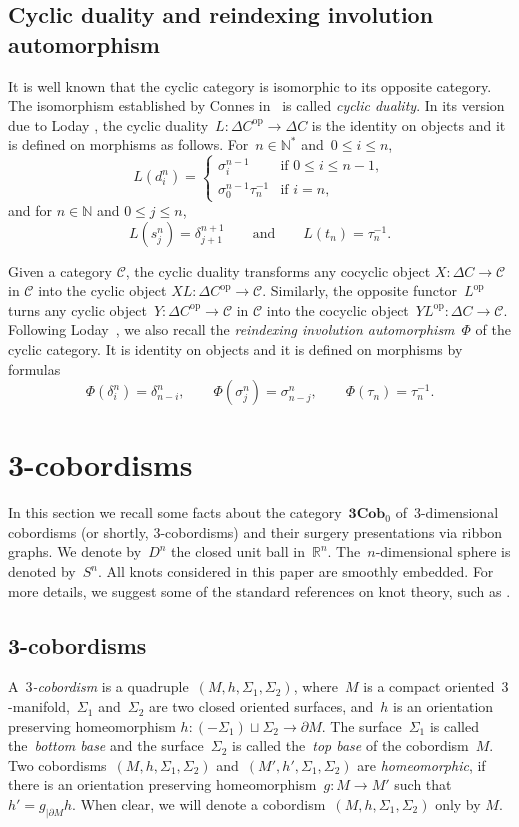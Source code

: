 \documentclass[10pt,a4paper]{amsart}
\numberwithin{equation}{section}
\newcommand{\co}{\colon}
\newcommand{\mc}{\mathcal}
\newcommand{\opp}{\mathrm{op}}
\newcommand{\N}{\mathbb{N}}
\newcommand{\R}{\mathbb{R}}
\newcommand{\Cob}{\textbf{Cob}}
\begin{document}
\subsection{Cyclic duality and reindexing involution automorphism} \label{connes loday dual}
It is well known that the cyclic category is isomorphic to its opposite category. The isomorphism established by Connes in~\cite{Connesext} is called \textit{cyclic duality}.
In its version due to Loday \cite[Proposition~6.1.11]{loday98}, the cyclic duality~$L \co \Delta C^\opp \to \Delta C$ is the identity on objects and it is defined on morphisms as follows.
For~$n\in \N^*$ and~$0\leq i \leq n$,
\[L(d_i^n)=
\begin{cases}
\sigma_i^{n-1} & \text{if } 0\leq i \leq n-1, \\
\sigma_0^{n-1}\tau_{n}^{-1} & \text{if } i=n,
\end{cases}\]
and for $n\in \N$ and $0\leq j \leq n$,
\[L(s_j^n)=\delta_{j+1}^{n+1} \qquad \text{and} \qquad L(t_n)=\tau_n^{-1}.\]

Given a category $\mc C$, the cyclic duality transforms any cocyclic object $X \co \Delta C \to {\mc C}$ in $\mc C$ into the cyclic object $XL\co \Delta C^\opp \to \mc C$. Similarly, the opposite functor~$L^\opp$ turns any cyclic object~$Y \co \Delta C^\opp \to \mc C$ in $\mc C$ into the cocyclic object~$YL^\opp \co \Delta C \to {\mc C}$.
Following Loday~\cite[Sec\-tion~6.1.14]{loday98}, we also recall the \textit{reindexing involution automorphism}~$\Phi$ of the cyclic category. It is identity on objects and it is defined on morphisms by formulas
\[\Phi(\delta_i^n)=\delta_{n-i}^n, \qquad \Phi(\sigma_j^n)=\sigma_{n-j}^n, \qquad \Phi(\tau_n)= \tau_n^{-1}.
\]

\section{3-cobordisms} \label{seccobs}
In this section we recall some facts about the category~$\textbf{3}\Cob_0$ of~$3$-dimensional cobordisms (or shortly, $3$-cobordisms) and their surgery presentations via ribbon graphs.
We denote by~$D^n$ the closed unit ball in~$\R^n$. The~$n$-dimensional sphere is denoted by~$S^n$.
All knots considered in this paper are smoothly embedded. For more details, we suggest some of the standard references on knot theory, such as \cite{burde2002knots, lickorish97}.

\subsection{3-cobordisms}
A~\emph{$3$-cobordism} is a quadruple~$(M,h,\Sigma_1,\Sigma_2)$, where~$M$ is a compact oriented~$3$-manifold,~$\Sigma_1$ and~$\Sigma_2$ are two closed oriented surfaces, and~$h$ is an orientation preserving homeomorphism $h\co (-\Sigma_1) \sqcup \Sigma_2 \to \partial M$. The surface~$\Sigma_1$ is called the~\textit{bottom base} and the surface~$\Sigma_2$ is called the~\textit{top base} of the cobordism~$M$.
Two cobordisms~$(M,h,\Sigma_1,\Sigma_2)$ and~$(M',h',\Sigma_1,\Sigma_2)$ are \textit{homeomorphic}, if there is an orientation preserving homeomorphism~$g\co M\to M'$ such that~$h'=g_{\vert\partial M}h$.
When clear, we will denote a cobordism~$(M,h,\Sigma_1,\Sigma_2)$ only by $M$.
\end{document}
